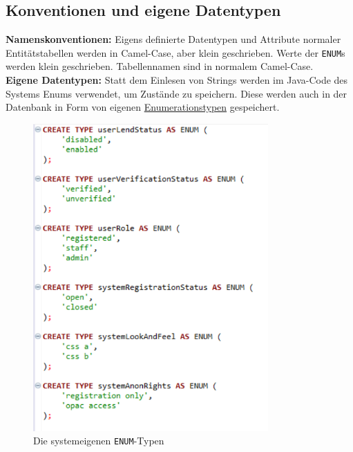 \documentclass{article}
\begin{document}
\subsection{Konventionen und eigene Datentypen}
\textbf{Namenskonventionen:} Eigens definierte Datentypen und Attribute normaler Entitätstabellen werden in Camel-Case, aber klein geschrieben. Werte der \texttt{ENUM}s werden klein geschrieben. Tabellennamen sind in normalem Camel-Case. \\
\textbf{Eigene Datentypen:} Statt dem Einlesen von Strings werden im Java-Code des Systems Enums verwendet, um Zustände zu speichern. Diese werden auch in der Datenbank in Form von eigenen \hyperlink{ENUMs}{Enumerationstypen} gespeichert.
\begin{figure}
\hypertarget{ENUMs}{}
\centering
\includegraphics[width=9cm]{SQLENUMs1}
\caption{Die systemeigenen \texttt{ENUM}-Typen}
\end{figure}
\end{document}
